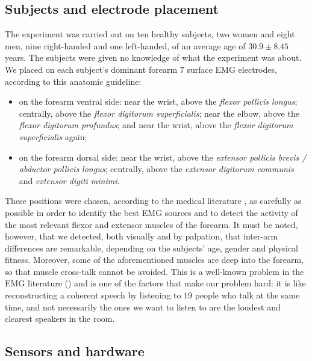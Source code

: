 \subsection{Subjects and electrode placement}

The experiment was carried out on ten healthy subjects, two women and
eight men, nine right-handed and one left-handed, of an average age of
$30.9 \pm 8.45$ years. The subjects were given no knowledge of what
the experiment was about. We placed on each subject's dominant forearm
$7$ surface EMG electrodes, according to this anatomic guideline:

\begin{itemize}

  \item on the forearm ventral side: near the wrist, above the
    \emph{flexor pollicis longus}; centrally, above the \emph{flexor
    digitorum superficialis}; near the elbow, above the \emph{flexor
    digitorum profundus}; and near the wrist, above the \emph{flexor
    digitorum superficialis} again;

  \item on the forearm dorsal side: near the wrist, above the
    \emph{extensor pollicis brevis / abductor pollicis longus};
    centrally, above the \emph{extensor digitorum communis} and
    \emph{extensor digiti minimi}.

\end{itemize}

These positions were chosen, according to the medical literature
\cite{Kendall},
as carefully as possible in order to identify the best EMG sources and
to detect the activity of the most relevant flexor and extensor
muscles of the forearm. It must be noted, however, that we detected,
both visually and by palpation, that inter-arm differences are
remarkable, depending on the subjects' age, gender and physical
fitness. Moreover, some of the aforementioned muscles are deep into
the forearm, so that muscle cross-talk cannot be avoided. This is a
well-known problem in the EMG literature (\cite{deluca,zecca}) and is
one of the factors that make our problem hard: it is like
reconstructing a coherent speech by listening to $19$ people who talk
at the same time, and not necessarily the ones we want to listen to
are the loudest and clearest speakers in the room.

\subsection{Sensors and hardware}

